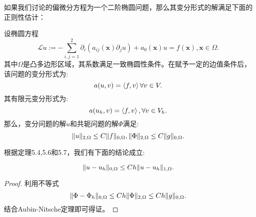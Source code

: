 如果我们讨论的偏微分方程为一个二阶椭圆问题，那么其变分形式的解满足下面的正则性估计：
\begin{theorem}
    设椭圆方程
    \begin{equation}
        \mathcal{L}u:=-\sum_{i,j=1}^{2}\partial_{i}(a_{ij}(\mathbf{x})\partial_{j}u)+a_{0}(\mathbf{x})u=f(\mathbf{x}),\mathbf{x}\in\Omega.
    \end{equation}
    其中$\Omega$是凸多边形区域，其系数满足一致椭圆性条件。在赋予一定的边值条件后，该问题的变分形式为:
    \begin{equation}
        a(u,v)=\left<f,v\right>\forall v\in V.
    \end{equation}
    其有限元变分形式为:
    \begin{equation}
        a(u_{h},v)=\left<f,v\right>,\forall v\in V_{h}.
    \end{equation}
    那么，变分问题的解$u$和共轭问题的解$\Phi$满足:
    \begin{equation}
        \|u\|_{2,\Omega}\le C\|f\|_{0,\Omega},\|\Phi\|_{2,\Omega}\le C\|g\|_{0,\Omega}.
    \end{equation}
\end{theorem}
    根据定理5.4,5.6和5.7，我们有下面的结论成立:
\begin{theorem}
    \begin{equation}
        \|u-u_{h}\|_{0,\Omega}\le Ch\|u-u_{h}\|_{1,\Omega}.
    \end{equation}
\end{theorem}
\begin{proof}
    利用不等式
    \begin{equation}
        \|\Phi-\Phi_{h}\|_{0,\Omega}\le Ch\|\Phi\|_{2,\Omega}\le Ch\|g\|_{0,\Omega}.
    \end{equation}
    结合Aubin-Nitsche定理即可得证。
\end{proof}
